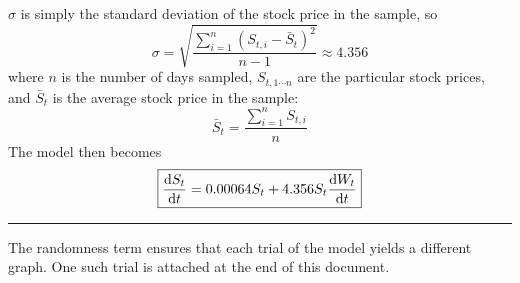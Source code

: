 \documentclass[12pt, A4]{report}
\newcommand{\Exp}{\mathbb{E}}
\newcommand{\comment}[1]{}
\begin{document}
	\(\sigma\) is simply the standard deviation of the stock price in the sample, so 
		\[\sigma = \sqrt{\frac{\sum\limits_{i = 1}^n(S_{t, i} - \bar{S}_{t})^2}{n - 1}} \approx 4.356\]
		where \(n\) is the number of days sampled, \(S_{t, 1 \cdots n}\) are the particular stock prices, and \(\bar{S}_t\) is the average stock price in the sample:
		\[\bar{S}_t = \frac{\sum\limits_{i = 1}^nS_{t,i}}{n}\]
	The model then becomes
		\[\boxed{\dv{S_t}{t} = 0.00064S_t + 4.356S_t\dv{W_t}{t}}\]
		\par\noindent\rule{\textwidth}{0.5mm}
		\comment{
			The following is the \href{https://docs.google.com/spreadsheets/d/10UhPew6GsC5f6DCJjFd24MZSaZ1SWjiQvmOD6k-tmcE/edit}{\underline{Excel spreadsheet}}. It uses data collected from Yahoo Finance on the value of GOOG (Alphabet Inc.'s stock price). \\
			A stock's price \(S_t\) (in USD) can be predicted with respect to time \(t\) (in days from an initial time) using a growth function; that is, by relating the rate at which the stock price is changing to the current stock price as a proportion:
				\[\dv{S_t}{t} \propto S_t\]
				The constant of proportionality is the drift \(\mu\) of the stock, which is the rate of change of the expected value \(\Exp[S_t]\) of the stock price with respect to time (which is not the expected value of its rate of change):
				\[
					\dv{S_t}{t} = \mu S_t \qquad \text{where} \qquad
					\mu= \frac{\Delta \Exp[S_t]}{\Delta t}
				\]
				The stock market is constantly volatile, though, changing in unpredictable ways. This randomness element can be modeled by a randomness term, proportional to the product of the stock price and the rate of change of the standard Wiener process \(W_t\) (as defined in Phase 2):
				\[\text{rate of randomness} \propto S_t\dv{W_t}{t}\]
				The proportionality constant is the volatility \(\sigma\) of the stock, which is simply its standard deviation. Adding this term,
				\[
					\dv{S_t}{t} = \mu S_t + \sigma S_t\dv{W_t}{t} \qquad \text{where} \qquad
					\sigma = \frac{\sum (S_{t, i} - \bar{S_t})}{n - 1} \qquad \text{and} \qquad
					\bar{S_t} = \frac{\sum S_{t, i}}{n}
				\]
		}
		The randomness term ensures that each trial of the model yields a different graph. One such trial is attached at the end of this document.
\end{document}
